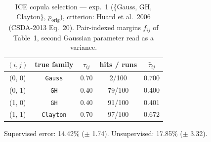 \begin{table}[htbp]
  \centering
  \caption{ICE copula selection — exp.\ 1 (\{Gauss, GH, Clayton\}, $p_{\text{orig}}$), criterion: Huard et al.\ 2006 (CSDA-2013 Eq.\ 20). Pair-indexed margins $f_{ij}$ of Table~1, second Gaussian parameter read as a variance.}
  \label{tab:exp3-exp1_orig_p__huard}
  \begin{tabular}{ccccc}
    \toprule
    $(i, j)$ & true family & $\tau_{ij}$ & hits / runs & $\hat\tau_{ij}$ \\
    \midrule
    (0, 0) & \texttt{Gauss} & 0.70 & 2/100 & 0.700 \\
    (0, 1) & \texttt{GH} & 0.40 & 79/100 & 0.400 \\
    (1, 0) & \texttt{GH} & 0.40 & 91/100 & 0.401 \\
    (1, 1) & \texttt{Clayton} & 0.70 & 97/100 & 0.672 \\
    \bottomrule
  \end{tabular}
  \par\smallskip Supervised error: 14.42\% ($\pm$ 1.74). Unsupervised: 17.85\% ($\pm$ 3.32).
\end{table}
